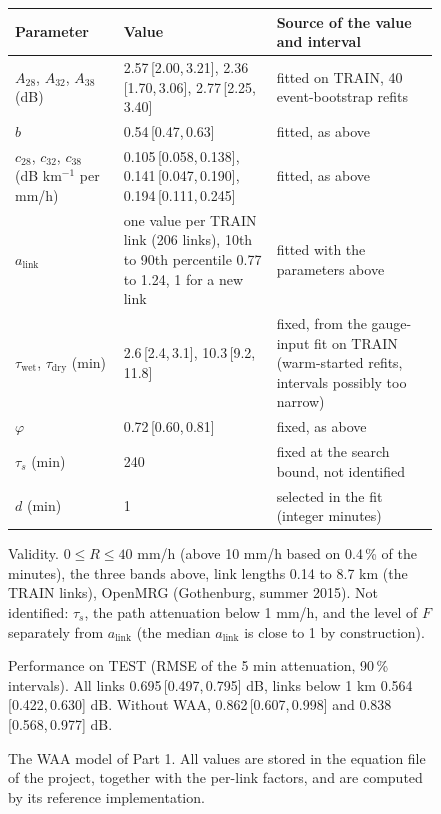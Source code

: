 \documentclass[11pt,a4paper]{article}
\newcommand{\alink}{a_{\mathrm{link}}}
\newcommand{\twet}{\tau_{\mathrm{wet}}}
\newcommand{\tdry}{\tau_{\mathrm{dry}}}
\newcommand{\iv}[2]{\,[#1,\,#2]}
\begin{document}
\begin{figure}[H]
{\begin{minipage}{0.955\textwidth}
\begin{tabularx}{\linewidth}{@{}>{\raggedright\arraybackslash}p{3.3cm} L >{\raggedright\arraybackslash}p{4.6cm}@{}}
\toprule
Parameter & Value & Source of the value and interval\\
\midrule
$A_{28}$, $A_{32}$, $A_{38}$ (dB) & 2.57\iv{2.00}{3.21}, 2.36\iv{1.70}{3.06}, 2.77\iv{2.25}{3.40} & fitted on TRAIN, 40 event-bootstrap refits\\
$b$ & 0.54\iv{0.47}{0.63} & fitted, as above\\
$c_{28}$, $c_{32}$, $c_{38}$ (dB km$^{-1}$ per mm/h) & 0.105\iv{0.058}{0.138}, 0.141\iv{0.047}{0.190}, 0.194\iv{0.111}{0.245} & fitted, as above\\
$\alink$ & one value per TRAIN link (206 links), 10th to 90th percentile 0.77 to 1.24, 1 for a new link & fitted with the parameters above\\
$\twet$, $\tdry$ (min) & 2.6\iv{2.4}{3.1}, 10.3\iv{9.2}{11.8} & fixed, from the gauge-input fit on TRAIN (warm-started refits, intervals possibly too narrow)\\
$\varphi$ & 0.72\iv{0.60}{0.81} & fixed, as above\\
$\tau_s$ (min) & 240 & fixed at the search bound, not identified\\
$d$ (min) & 1 & selected in the fit (integer minutes)\\
\bottomrule
\end{tabularx}

\smallskip
{\sffamily Validity.} $0 \le R \le 40$ mm/h (above 10 mm/h based on 0.4\,\% of the minutes), the three bands above, link lengths
0.14 to 8.7 km (the TRAIN links), OpenMRG (Gothenburg, summer 2015). Not identified: $\tau_s$, the path attenuation below 1 mm/h,
and the level of $F$ separately from $\alink$ (the median $\alink$ is close to 1 by construction).

\smallskip
{\sffamily Performance on TEST} (RMSE of the 5 min attenuation, 90\,\% intervals). All links 0.695\iv{0.497}{0.795} dB, links
below 1 km 0.564\iv{0.422}{0.630} dB. Without WAA, 0.862\iv{0.607}{0.998} and 0.838\iv{0.568}{0.977} dB.
\end{minipage}}
\caption{The WAA model of Part 1. All values are stored in the equation file of the project, together with the per-link
factors, and are computed by its reference implementation.}
\label{fig:model}
\end{figure}
\end{document}
